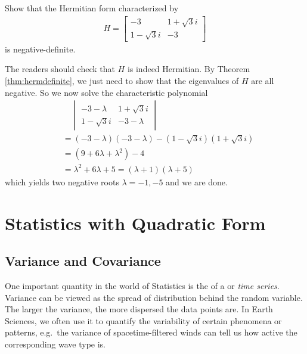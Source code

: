 \begin{exmp}
Show that the Hermitian form characterized by
\begin{align*}
H =
\begin{bmatrix}
-3 & 1+\sqrt{3}i\\ 
1-\sqrt{3}i & -3
\end{bmatrix}
\end{align*}
is negative-definite.
\end{exmp}
\begin{solution}
The readers should check that $H$ is indeed Hermitian. By Theorem \ref{thm:hermdefinite}, we just need to show that the eigenvalues of $H$ are all negative. So we now solve the characteristic polynomial
\begin{align*}
&\quad \begin{vmatrix}
-3-\lambda & 1+\sqrt{3}i\\ 
1-\sqrt{3}i & -3-\lambda
\end{vmatrix} \\
&= (-3-\lambda)(-3-\lambda) - (1-\sqrt{3}i)(1+\sqrt{3}i) \\
&= (9 + 6\lambda + \lambda^2) - 4 \\
&= \lambda^2 + 6\lambda + 5 = (\lambda + 1)(\lambda + 5)
\end{align*}
which yields two negative roots $\lambda = -1, -5$ and we are done.
\end{solution}

\section{Statistics with Quadratic Form}

\subsection{Variance and Covariance}
\label{section:variancesec}
One important quantity in the world of Statistics is the  of a  or \textit{time series}. Variance can be viewed as the spread of distribution behind the random variable. The larger the variance, the more dispersed the data points are. In Earth Sciences, we often use it to quantify the variability of certain phenomena or patterns, e.g.\ the variance of spacetime-filtered winds can tell us how active the corresponding wave type is.

